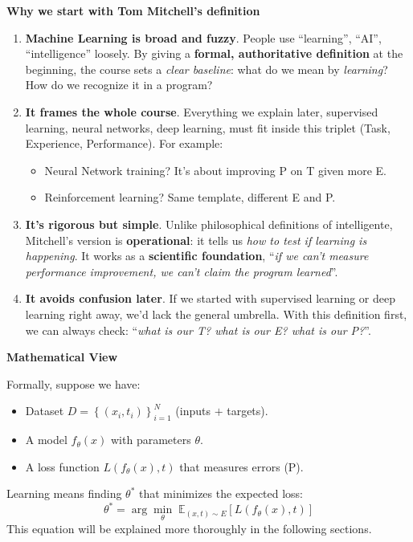 \newpage

\begin{flushleft}
    \textcolor{Green3}{ \textbf{Why we start with Tom Mitchell's definition}}
\end{flushleft}
\begin{enumerate}
    \item \textbf{Machine Learning is broad and fuzzy}. People use ``learning'', ``AI'', ``intelligence'' loosely. By giving a \textbf{formal, authoritative definition} at the beginning, the course sets a \emph{clear baseline}: what do we mean by \emph{learning}? How do we recognize it in a program?
    \item \textbf{It frames the whole course}. Everything we explain later, supervised learning, neural networks, deep learning, must fit inside this triplet (Task, Experience, Performance). For example:
    \begin{itemize}
        \item Neural Network training? It's about improving P on T given more E.
        \item Reinforcement learning? Same template, different E and P.
    \end{itemize}
    \item \textbf{It's rigorous but simple}. Unlike philosophical definitions of intelligente, Mitchell's version is \textbf{operational}: it tells us \emph{how to test if learning is happening}. It works as a \textbf{scientific foundation}, ``\emph{if we can't measure performance improvement, we can't claim the program learned}''.
    \item \textbf{It avoids confusion later}. If we started with supervised learning or deep learning right away, we'd lack the general umbrella. With this definition first, we can always check: ``\emph{what is our T? what is our E? what is our P?}''.
\end{enumerate}

\begin{flushleft}
    \textcolor{Green3}{ \textbf{Mathematical View}}
\end{flushleft}
Formally, suppose we have:
\begin{itemize}
    \item Dataset $D = \left\{\left(x_{i}, t_{i}\right)\right\}_{i=1}^{N}$ (inputs $+$ targets).
    \item A model $f_\theta(x)$ with parameters $\theta$.
    \item A loss function $L(f_\theta(x), t)$ that measures errors (P).
\end{itemize}
Learning means finding $\theta^{*}$ that minimizes the expected loss:
\begin{equation*}
    \theta^{*} = \arg\min_{\theta} \; \mathbb{E}_{\left(x,t\right) \sim E}\left[L \left(f_{\theta}(x), t\right)\right]
\end{equation*}
This equation will be explained more thoroughly in the following sections.
